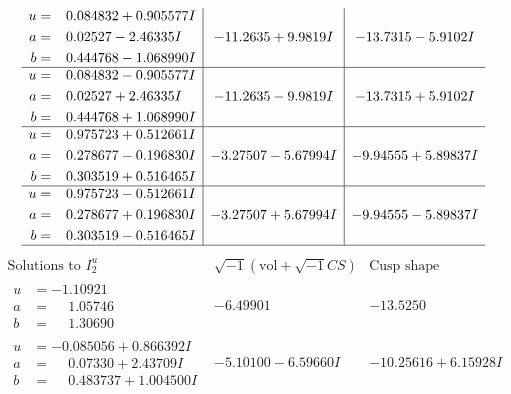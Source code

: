 \documentclass[1p]{elsarticle_modified}
\theoremstyle{definition}
\newcommand{\I}{\sqrt{-1}}
\begin{document}
$$\begin{array}{c|c|c}
\begin{aligned}
u &= \phantom{-}0.084832 + 0.905577 I \\
a &= \phantom{-}0.02527 - 2.46335 I \\
b &= \phantom{-}0.444768 - 1.068990 I\end{aligned}
 & -11.2635 + 9.9819 I & -13.7315 - 5.9102 I \\ \hline\begin{aligned}
u &= \phantom{-}0.084832 - 0.905577 I \\
a &= \phantom{-}0.02527 + 2.46335 I \\
b &= \phantom{-}0.444768 + 1.068990 I\end{aligned}
 & -11.2635 - 9.9819 I & -13.7315 + 5.9102 I \\ \hline\begin{aligned}
u &= \phantom{-}0.975723 + 0.512661 I \\
a &= \phantom{-}0.278677 - 0.196830 I \\
b &= \phantom{-}0.303519 + 0.516465 I\end{aligned}
 & -3.27507 - 5.67994 I & -9.94555 + 5.89837 I \\ \hline\begin{aligned}
u &= \phantom{-}0.975723 - 0.512661 I \\
a &= \phantom{-}0.278677 + 0.196830 I \\
b &= \phantom{-}0.303519 - 0.516465 I\end{aligned}
 & -3.27507 + 5.67994 I & -9.94555 - 5.89837 I\\
 \hline 
 \end{array}$$\newpage$$\begin{array}{c|c|c}  
\text{Solutions to }I^u_{2}& \I (\text{vol} + \sqrt{-1}CS) & \text{Cusp shape}\\
 \hline 
\begin{aligned}
u &= -1.10921\phantom{ +0.000000I} \\
a &= \phantom{-}1.05746\phantom{ +0.000000I} \\
b &= \phantom{-}1.30690\phantom{ +0.000000I}\end{aligned}
 & -6.49901\phantom{ +0.000000I} & -13.5250\phantom{ +0.000000I} \\ \hline\begin{aligned}
u &= -0.085056 + 0.866392 I \\
a &= \phantom{-}0.07330 + 2.43709 I \\
b &= \phantom{-}0.483737 + 1.004500 I\end{aligned}
 & -5.10100 - 6.59660 I & -10.25616 + 6.15928 I \\ \hline\begin{aligned}

\end{aligned}
\end{array}$$
\end{document}
